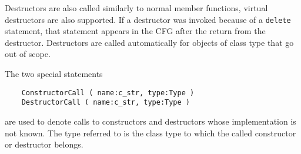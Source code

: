Destructors are also called similarly to normal member functions,
virtual destructors are also supported. If a destructor was invoked
because of a \lstinline|delete| statement, that statement appears in
the CFG after the return from the destructor. Destructors are called
automatically for objects of class type that go out of scope.

The two special statements
\begin{verbatim}
    ConstructorCall ( name:c_str, type:Type )
    DestructorCall ( name:c_str, type:Type )
\end{verbatim}
are used to denote calls to constructors and destructors whose
implementation is not known. The type referred to is the class type
to which the called constructor or destructor belongs.
